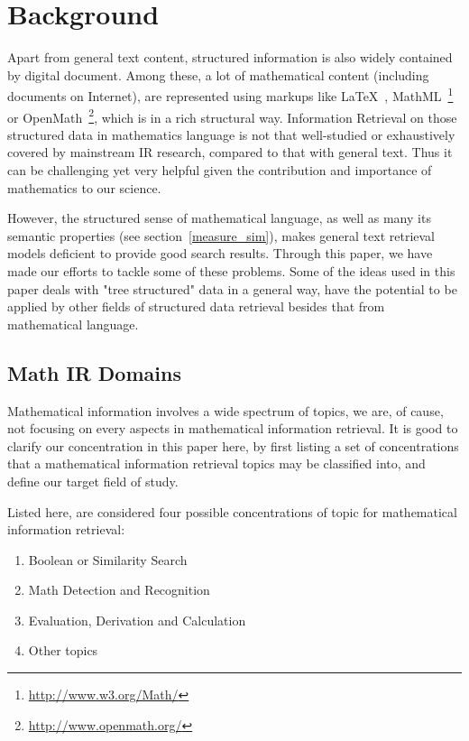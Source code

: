 \chapter{Background}
Apart from general text content, structured information is also widely contained by digital document. Among these, a lot of mathematical content (including documents on Internet), are represented using markups like \LaTeX\  , MathML~\footnote{\url{http://www.w3.org/Math/}} or OpenMath~\footnote{\url{http://www.openmath.org/}}, which is in a rich structural way. 
Information Retrieval on those structured data in mathematics language is not that well-studied or exhaustively covered by mainstream IR research, compared to that with general text. 
Thus it can be challenging yet very helpful given the contribution and importance of mathematics to our science. 

However, the structured sense of mathematical language, as well as many its semantic properties (see section~\ref{measure_sim}), makes general text retrieval models deficient to provide good search results. Through this paper, we have made our efforts to tackle some of these problems. 
Some of the ideas used in this paper deals with "tree structured" data in a general way, have the potential to be applied by other fields of structured data retrieval besides that from mathematical language. 

\section{Math IR Domains}

Mathematical information involves a wide spectrum of topics, 
we are, of cause, not focusing on every aspects in mathematical information retrieval. 
It is good to clarify our concentration in this paper here, by first listing a set of concentrations that a mathematical information retrieval topics may be classified into,
and define our target field of study.

\pagebreak
Listed here, are considered four possible concentrations of topic for mathematical information retrieval:

\begin{enumerate}
\item Boolean or Similarity Search
\item Math Detection and Recognition
\item Evaluation, Derivation and Calculation
\item Other topics 
\end{enumerate}

